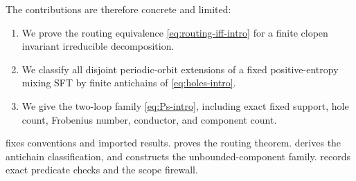The contributions are therefore concrete and limited:

\begin{enumerate}[label=(\roman*)]
  \item We prove the routing equivalence \eqref{eq:routing-iff-intro} for a
  finite clopen invariant irreducible decomposition.
  \item We classify all disjoint periodic-orbit extensions of a fixed
  positive-entropy mixing SFT by finite antichains of \eqref{eq:holes-intro}.
  \item We give the two-loop family \eqref{eq:Ps-intro}, including exact fixed
  support, hole count, Frobenius number, conductor, and component count.
\end{enumerate}

 fixes conventions and imported results.
 proves the routing theorem.  
derives the antichain classification, and  constructs the
unbounded-component family.   records exact predicate
checks and the scope firewall.

